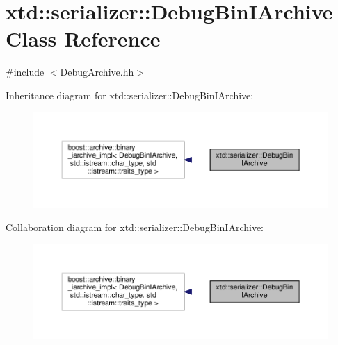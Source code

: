 \hypertarget{classxtd_1_1serializer_1_1DebugBinIArchive}{}\section{xtd\+:\+:serializer\+:\+:Debug\+Bin\+I\+Archive Class Reference}
\label{classxtd_1_1serializer_1_1DebugBinIArchive}


{\ttfamily \#include $<$Debug\+Archive.\+hh$>$}



Inheritance diagram for xtd\+:\+:serializer\+:\+:Debug\+Bin\+I\+Archive\+:
\nopagebreak
\begin{figure}[H]
\begin{center}
\leavevmode
\includegraphics[width=350pt]{classxtd_1_1serializer_1_1DebugBinIArchive__inherit__graph}
\end{center}
\end{figure}


Collaboration diagram for xtd\+:\+:serializer\+:\+:Debug\+Bin\+I\+Archive\+:
\nopagebreak
\begin{figure}[H]
\begin{center}
\leavevmode
\includegraphics[width=350pt]{classxtd_1_1serializer_1_1DebugBinIArchive__coll__graph}
\end{center}
\end{figure}
